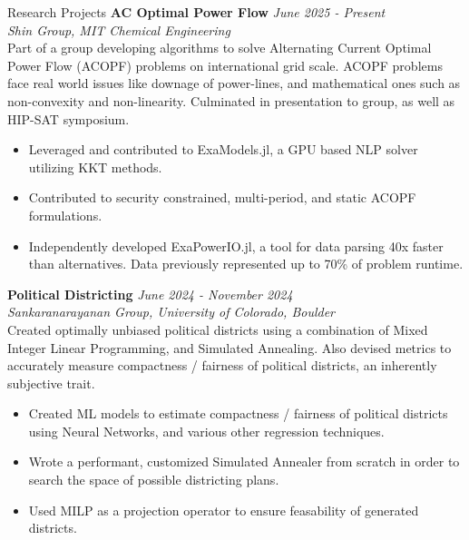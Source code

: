 \documentclass[10pt]{resume}
\newenvironment{rlist}{
  \begin{itemize}{\leftmargin=0em}
  \itemsep -0.5em \vspace{-0.5em}
  }{\end{itemize}}
\begin{document}
\begin{rSection}{Research Projects}
    \textbf{AC Optimal Power Flow} \hfill \textit{June 2025 - Present} \\
    \textit{Shin Group, MIT Chemical Engineering} \\
    Part of a group developing algorithms to solve Alternating Current Optimal
    Power Flow (ACOPF) problems on international grid scale. ACOPF problems
    face real world issues like downage of power-lines, and mathematical ones
    such as non-convexity and non-linearity. Culminated in presentation to
    group, as well as HIP-SAT symposium.
    \begin{rlist}
        \item Leveraged and contributed to ExaModels.jl, a GPU based NLP solver
            utilizing KKT methods.
        \item Contributed to security constrained, multi-period, and static
            ACOPF formulations.
        \item Independently developed ExaPowerIO.jl, a tool for data parsing
            40x faster than alternatives. Data previously represented up to
            70\% of problem runtime.
    \end{rlist}

    \textbf{Political Districting} \hfill \textit{June 2024 - November 2024}\\ 
    \textit{Sankaranarayanan Group, University of Colorado, Boulder} \\
    Created optimally unbiased political districts using a combination of Mixed
    Integer Linear Programming, and Simulated Annealing. Also devised metrics
    to accurately measure compactness / fairness of political districts, an
    inherently subjective trait.
    \begin{rlist}
        \item Created ML models to estimate compactness / fairness of political
            districts using Neural Networks, and various other regression
            techniques.
        \item Wrote a performant, customized Simulated Annealer from scratch in
            order to search the space of possible districting plans.
        \item Used MILP as a projection operator to ensure feasability of
            generated districts.
    \end{rlist}
\end{rSection}
\end{document}
